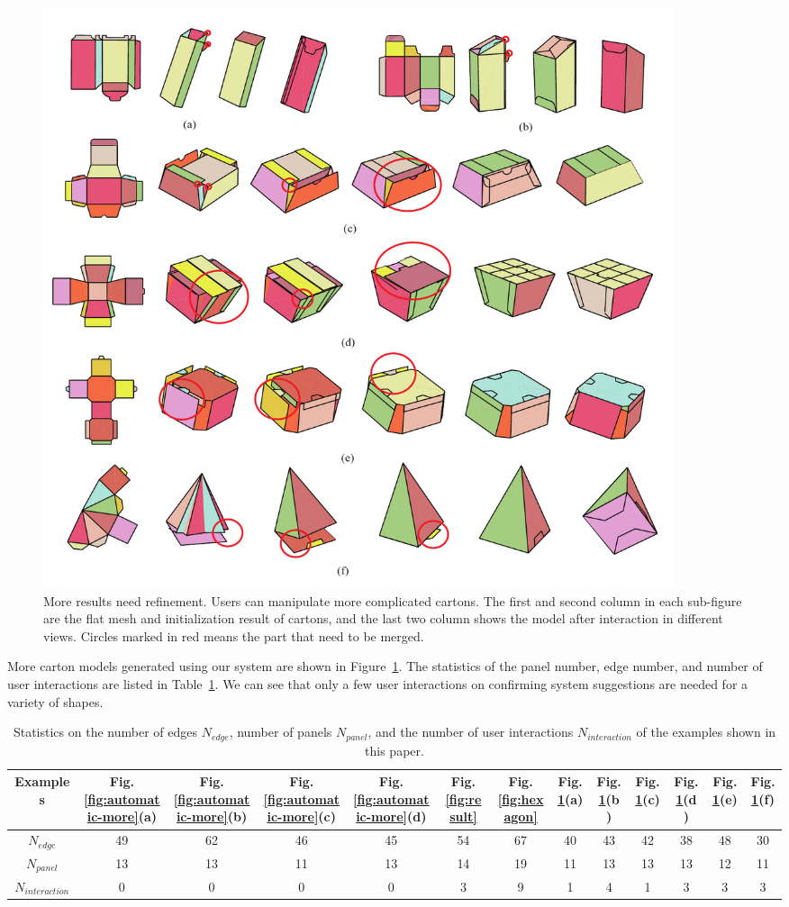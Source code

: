 \begin{figure}
	\centering
	\includegraphics[width=0.9\textwidth]{images/newMore}
	\caption{More results need refinement. Users can manipulate more complicated cartons. The first and second column in each sub-figure are the flat mesh and initialization result of cartons, and the last two column shows the model after interaction in  different views. Circles marked in red means the part that need to be merged.}
	\label{fig:result-more}
\end{figure}



More carton models generated using our system  are shown in Figure~\ref{fig:result-more}.
The statistics of the panel number, edge number, and number of user interactions are listed in Table~\ref{table:statistics}. 
We can see that only a few user interactions on confirming system suggestions are needed for a variety of shapes.


\begin{table}
	\centering
	\caption{Statistics on the number of edges $N_{edge}$, number of panels $N_{panel}$, and the number of user interactions $N_{interaction}$ of the examples shown in this paper.}
	\setlength{\tabcolsep}{1pt}
	\begin{tabular}{c|c|c|c|c|c|c|c|c|c|c|c|c}
		\hline
		Examples & Fig.\ref{fig:automatic-more}(a) & Fig.\ref{fig:automatic-more}(b) &  Fig.\ref{fig:automatic-more}(c) & Fig.\ref{fig:automatic-more}(d) & Fig.\ref{fig:result} & Fig.\ref{fig:hexagon} & Fig.\ref{fig:result-more}(a) & Fig.\ref{fig:result-more}(b)& Fig.\ref{fig:result-more}(c) &  Fig.\ref{fig:result-more}(d) & Fig.\ref{fig:result-more}(e)& Fig.\ref{fig:result-more}(f)\\
		\hline
		$N_{edge}$ & 49 & 62 & 46 & 45 & 54 & 67 & 40 & 43 & 42 & 38 & 48 & 30\\
		$N_{panel}$  & 13 & 13 & 11 & 13 & 14 & 19 & 11 & 13 & 13 & 13 & 12 & 11\\
		$N_{interaction}$  & 0 & 0 & 0 & 0 & 3 & 9 & 1 & 4 & 1 & 3 & 3 & 3\\ 
		\hline
		\end{tabular}
		\label{table:statistics}
\end{table}


